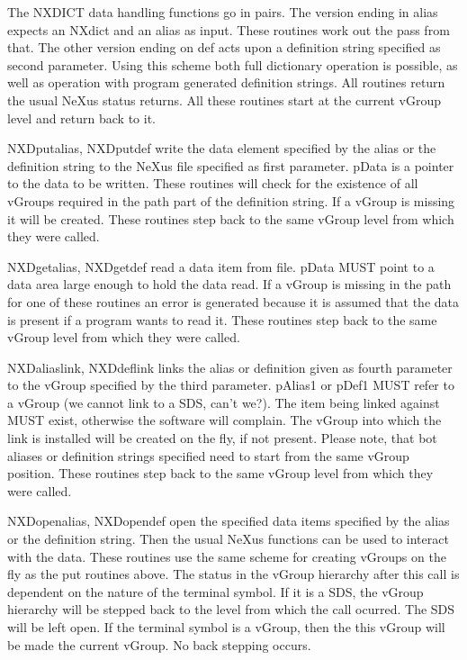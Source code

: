 \documentclass[12pt]{article}
\begin{document}
The NXDICT data handling functions go in pairs. The version ending in
 alias expects an NXdict and an alias as input. These routines work
 out the pass from that. The other version ending on def acts upon 
 a definition string specified as second parameter. Using this scheme
 both full dictionary operation is possible, as well as operation with
 program generated definition strings. All routines return the
 usual NeXus status returns. All these routines start at the current vGroup
 level and return back to it.  

 NXDputalias, NXDputdef write the data element specified by the alias or
 the definition string to the NeXus file specified as first parameter. 
 pData is a pointer to the data to be written. These routines will check for
 the existence of all vGroups required in the path part of the definition
 string. If a vGroup  is missing it will be created. These routines step
 back to the same vGroup level from which they were called.

 NXDgetalias, NXDgetdef read a data item from file. pData MUST point to a
 data area large enough to hold the data read. If a vGroup is missing in
 the path for one of these routines an error is generated because it is 
 assumed that the data is present if a program wants to read it. These 
 routines step
 back to the same vGroup level from which they were called.
 
 NXDaliaslink, NXDdeflink links the alias or definition given as fourth
 parameter to the vGroup specified by the  third parameter. pAlias1 or
 pDef1 MUST refer to a vGroup (we cannot link to a SDS, can't we?). The
 item being linked against MUST exist, otherwise the software will complain.
 The vGroup into which the link is installed will be created on the fly,
 if not present.
 Please note, that bot aliases or definition strings specified need to
 start from the same vGroup position.  These routines step
 back to the same vGroup level from which they were called. 

 NXDopenalias, NXDopendef open the specified data items specified by the
 alias or the definition string. Then the usual NeXus functions can be 
 used to interact with the data. These routines use the same scheme for
 creating vGroups on the fly as the put routines above. The status in the
 vGroup hierarchy after this call is dependent on the nature of the terminal
 symbol. If it is a SDS, the vGroup hierarchy will be stepped back to the
 level from which the call ocurred. The SDS will be left open. If the
 terminal symbol is a vGroup, then the this vGroup will be made the current
 vGroup. No back stepping occurs. 
\end{document}
